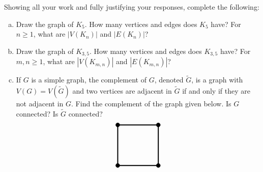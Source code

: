 \documentclass[11pt,letterpaper]{article}
\begin{document}
\newpage



 Showing all your work and fully justifying your responses, complete the following:
	\begin{enumerate}[(a)]
	\item Draw the graph of $K_5$. How many vertices and edges does $K_5$ have? For $n \geq 1$, what are $|V(K_n)|$ and $|E(K_n)|$?
	\item Draw the graph of $K_{3, 5}$. How many vertices and edges does $K_{3, 5}$ have? For $m, n \geq 1$, what are $|V(K_{m, n})|$ and $|E(K_{m, n})|$?
	\item If $G$ is a simple graph, the complement of $G$, denoted $\widetilde{G}$, is a graph with $V(G)= V(\widetilde{G})$ and two vertices are adjacent in $\widetilde{G}$ if and only if they are not adjacent in $G$. Find the complement of the graph given below. Is $G$ connected? Is $\widetilde{G}$ connected? 
		\[
		\begin{tikzpicture}[scale=2]
		\draw[line width= 0.05cm] (0,0) -- (1,0) -- (1,1) -- (0,1) -- (0,0);
		
		\draw[fill=black] (0,0) circle (0.05); 
		\draw[fill=black] (1,0) circle (0.05); 
		\draw[fill=black] (1,1) circle (0.05); 
		\draw[fill=black] (0,1) circle (0.05); 
		\end{tikzpicture}
		\]
	\end{enumerate}



\newpage
\end{document}
